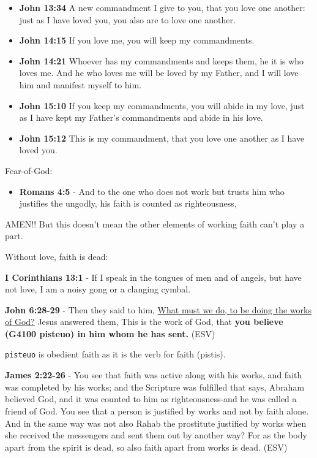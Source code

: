 \documentclass[11pt]{article}
\begin{document}
\begin{itemize}
\item \textbf{John 13:34} A new commandment I give to you, that you love one another: just as I have loved you, you also are to love one another.
\item \textbf{John 14:15} If you love me, you will keep my commandments.
\item \textbf{John 14:21} Whoever has my commandments and keeps them, he it is who loves me. And he who loves me will be loved by my Father, and I will love him and manifest myself to him.
\item \textbf{John 15:10} If you keep my commandments, you will abide in my love, just as I have kept my Father's commandments and abide in his love.
\item \textbf{John 15:12} This is my commandment, that you love one another as I have loved you.
\end{itemize}

Fear-of-God:
\begin{itemize}
\item \textbf{Romans 4:5} - And to the one who does not work but trusts him who justifies the ungodly, his faith is counted as righteousness,
\end{itemize}

AMEN!! But this doesn't mean the other elements of working faith can't play a part.

Without love, faith is dead:

\textbf{I Corinthians 13:1} - If I speak in the tongues of men and of angels, but have not love, I am a noisy gong or a clanging cymbal.

\textbf{John 6:28-29} - Then they said to him, \uline{What must we do, to be doing the works of God?} Jesus answered them, This is the work of God, that \textbf{you believe (G4100 pisteuo) in him whom he has sent.} (ESV)

\texttt{pisteuo} is obedient faith as it is the verb for faith (pistis).

\textbf{James 2:22-26} - You see that faith was active along with his works, and faith was completed by his works; and the Scripture was fulfilled that says, Abraham believed God, and it was counted to him as righteousness-and he was called a friend of God. You see that a person is justified by works and not by faith alone. And in the same way was not also Rahab the prostitute justified by works when she received the messengers and sent them out by another way? For as the body apart from the spirit is dead, so also faith apart from works is dead. (ESV)
\end{document}

